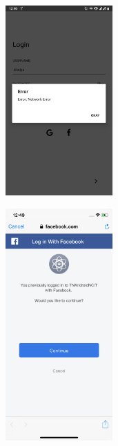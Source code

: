 \documentclass[12pt, a4paper, oneside]{article}
\begin{document}
\begin{figure}[H]
\begin{subfigure}{.5\textwidth}
    \centering
    \includegraphics[width=0.45\textwidth]{test-evidences/auth/c.png}
    \caption{}
\end{subfigure}%
\begin{subfigure}{.5\textwidth}
    \centering
    \includegraphics[width=0.45\textwidth]{test-evidences/auth/d.png}
    \caption{}
\end{subfigure}


\end{figure}
\end{document}
